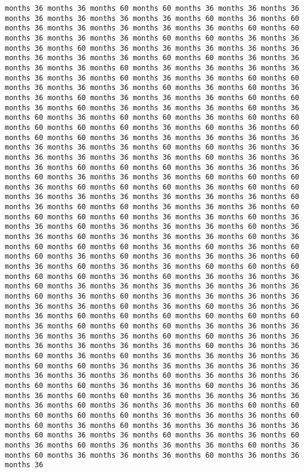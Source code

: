 \documentclass[11pt]{article}
\begin{document}
\begin{Verbatim}[commandchars=\\\{\}, frame=single, framerule=2mm, rulecolor=\color{outerrorbackground}]
months 36 months 36 months 60 months 60 months 36 months 36 months 36 months 36 months 36 months 36 months 36 months 60 months 36 months 60 months 36 months 36 months 36 months 36 months 36 months 60 months 60 months 36 months 36 months 36 months 60 months 60 months 36 months 36 months 36 months 60 months 36 months 36 months 36 months 36 months 36 months 36 months 36 months 36 months 60 months 60 months 36 months 36 months 36 months 36 months 60 months 36 months 36 months 36 months 36 months 36 months 36 months 60 months 36 months 36 months 60 months 60 months 36 months 36 months 36 months 60 months 36 months 60 months 36 months 36 months 60 months 36 months 36 months 36 months 60 months 60 months 36 months 60 months 36 months 36 months 36 months 60 months 36 months 60 months 36 months 60 months 60 months 36 months 60 months 60 months 60 months 60 months 60 months 36 months 60 months 36 months 60 months 60 months 60 months 36 months 36 months 36 months 36 months 36 months 36 months 36 months 36 months 60 months 60 months 36 months 36 months 36 months 36 months 36 months 36 months 60 months 36 months 36 months 36 months 60 months 60 months 60 months 36 months 36 months 36 months 60 months 36 months 36 months 36 months 60 months 60 months 60 months 36 months 60 months 60 months 60 months 36 months 60 months 60 months 36 months 36 months 36 months 36 months 36 months 36 months 60 months 36 months 60 months 60 months 36 months 36 months 36 months 60 months 60 months 60 months 60 months 36 months 36 months 60 months 36 months 36 months 60 months 36 months 36 months 36 months 60 months 36 months 36 months 60 months 36 months 36 months 36 months 60 months 36 months 60 months 60 months 60 months 36 months 60 months 36 months 60 months 60 months 36 months 60 months 36 months 36 months 36 months 60 months 36 months 60 months 36 months 36 months 60 months 60 months 60 months 60 months 60 months 36 months 60 months 36 months 36 months 36 months 60 months 36 months 36 months 36 months 36 months 36 months 36 months 60 months 36 months 60 months 36 months 36 months 36 months 36 months 36 months 36 months 60 months 36 months 60 months 36 months 36 months 36 months 60 months 60 months 60 months 60 months 60 months 60 months 36 months 60 months 60 months 60 months 36 months 36 months 36 months 36 months 36 months 36 months 60 months 60 months 36 months 36 months 36 months 36 months 36 months 36 months 60 months 36 months 36 months 60 months 36 months 60 months 36 months 36 months 36 months 36 months 60 months 60 months 36 months 36 months 36 months 36 months 36 months 36 months 36 months 36 months 60 months 36 months 36 months 36 months 60 months 60 months 36 months 36 months 60 months 36 months 36 months 36 months 60 months 60 months 36 months 36 months 36 months 36 months 36 months 60 months 36 months 36 months 36 months 60 months 60 months 60 months 60 months 60 months 36 months 36 months 36 months 60 months 60 months 36 months 60 months 36 months 36 months 36 months 36 months 60 months 36 months 36 months 60 months 36 months 36 months 60 months 36 months 60 months 36 months 36 months 36 months 60 months 36 months 60 months 36 months 36 months 36 months 60 months 36 months 36 months 36 
\end{Verbatim}
\end{document}
